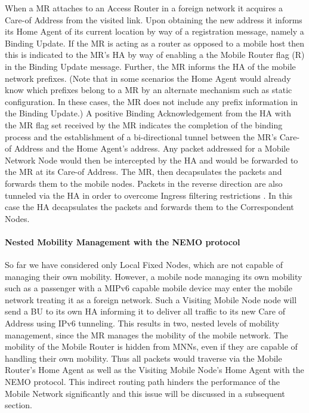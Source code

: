 When a MR attaches to an Access Router in a foreign network it acquires a
Care-of Address from the visited link. Upon obtaining the new address it
informs its Home Agent of its current location by way of a registration
message, namely a Binding Update. If the MR is acting as a router as opposed
to a mobile host then this is indicated to the MR's HA by way of enabling a
the Mobile Router flag (R) in the Binding Update message. Further, the MR
informs the HA of the mobile network prefixes. (Note that in some scenarios
the Home Agent would already know which prefixes belong to a MR by
an alternate mechanism such as static configuration. In these cases, the
MR does not include any prefix information in the Binding Update.)
A positive Binding Acknowledgement from the HA with the MR flag set
received by the MR indicates the completion of the binding process and the
establishment of a bi-directional tunnel between the MR's Care-of Address and
the Home Agent's address. Any packet addressed for a Mobile Network Node would
then be intercepted by the HA and would be forwarded to the MR at its Care-of
Address. The MR, then decapsulates the packets and forwards them to the mobile
nodes. Packets in the reverse direction are also tunneled via the HA in order
to overcome Ingress filtering restrictions \cite{13}. In this case the HA
decapsulates the packets and forwards them to the Correspondent Nodes.

\paragraph{Nested Mobility Management with the NEMO protocol}

So far we have considered only Local Fixed Nodes, which are not capable of
managing their own mobility. However, a mobile node managing its own mobility
such as a passenger with a MIPv6 capable mobile device may enter the mobile
network treating it as a foreign network. Such a Visiting Mobile Node node
will send a BU to its own HA informing it to deliver all traffic to its new
Care of Address using IPv6 tunneling. This results in two, nested levels of mobility
management, since the MR manages the mobility of the mobile network. The
mobility of the Mobile Router is hidden from MNNs, even if they are capable of
handling their own mobility. Thus all packets would traverse via the Mobile
Router's Home Agent as well as the Visiting Mobile Node's Home Agent with the
NEMO protocol. This indirect routing path hinders the performance of the
Mobile Network significantly and this issue will be discussed in a subsequent section.

